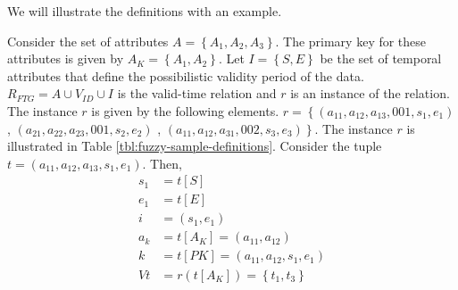 \begin{definition}
We will illustrate the definitions with an example.

\begin{example}
Consider the set of attributes $A = \left \lbrace A_1, A_2, A_3 \right \rbrace$. The primary key for these attributes is given by $A_K = \left \lbrace A_1, A_2 \right \rbrace$. Let $I = \left \lbrace S, E \right \rbrace$ be the set of temporal attributes that define the possibilistic validity period of the data. $R_{FTG} = A \cup V_{ID} \cup I$ is the valid-time relation and $r$ is an instance of the relation. The instance $r$ is given by the following elements. $r = \left \lbrace \left(a_{11}, a_{12}, a_{13}, 001, s_1 ,e_1 \right) \right.$,  $\left(a_{21}, a_{22}, a_{23}, 001, s_2, e_2 \right)$ , $\left. \left(a_{11}, a_{12}, a_{31}, 002, s_3, e_3 \right) \right \rbrace$. The instance $r$ is illustrated in Table \ref{tbl:fuzzy-sample-definitions}. 
Consider the tuple $t = \left(a_{11}, a_{12}, a_{13}, s_1 ,e_1 \right)$. Then,
\begin{align}
 \nonumber
s_1 &= t\left[S \right]\\
 \nonumber
e_1 &= t[E]\\
 \nonumber
i\ \ &= \left(s_1, e_1\right)\\
 \nonumber
a_k &= t\left[A_K\right] = \left(a_{11}, a_{12} \right) \\
 \nonumber
k &= t\left[PK\right] =\left(a_{11}, a_{12}, s_1, e_1\right)\\
 \nonumber
Vt &= r\left(t\left[A_K\right] \right) = \left \lbrace t_1, t_3 \right \rbrace
\end{align}



\end{example}





\end{definition}
